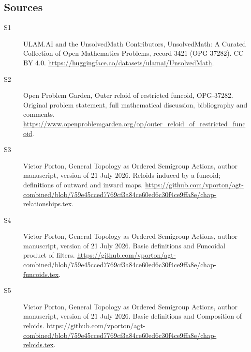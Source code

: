 \documentclass[11pt]{article}
\begin{document}
\subsection{Sources}
\begin{description}
\item[\hypertarget{source:3421:1}{S1}] ULAM.AI and the UnsolvedMath Contributors, UnsolvedMath: A Curated Collection of Open Mathematics Problems, record 3421 (OPG-37282). CC BY 4.0. \url{https://huggingface.co/datasets/ulamai/UnsolvedMath}.
\item[\hypertarget{source:3421:2}{S2}] Open Problem Garden, Outer reloid of restricted funcoid, OPG-37282. Original problem statement, full mathematical discussion, bibliography and comments. \url{https://www.openproblemgarden.org/op/outer_reloid_of_restricted_funcoid}.
\item[\hypertarget{source:3421:3}{S3}] Victor Porton, General Topology as Ordered Semigroup Actions, author manuscript, version of 21 July 2026. Reloids induced by a funcoid; definitions of outward and inward maps. \url{https://github.com/vporton/agt-combined/blob/759e45cced7769cf3a84ce60ed6c30f4ce9ffa8e/chap-relationships.tex}.
\item[\hypertarget{source:3421:4}{S4}] Victor Porton, General Topology as Ordered Semigroup Actions, author manuscript, version of 21 July 2026. Basic definitions and Funcoidal product of filters. \url{https://github.com/vporton/agt-combined/blob/759e45cced7769cf3a84ce60ed6c30f4ce9ffa8e/chap-funcoids.tex}.
\item[\hypertarget{source:3421:5}{S5}] Victor Porton, General Topology as Ordered Semigroup Actions, author manuscript, version of 21 July 2026. Basic definitions and Composition of reloids. \url{https://github.com/vporton/agt-combined/blob/759e45cced7769cf3a84ce60ed6c30f4ce9ffa8e/chap-reloids.tex}.
\end{description}
\label{end:3421}
\end{document}
